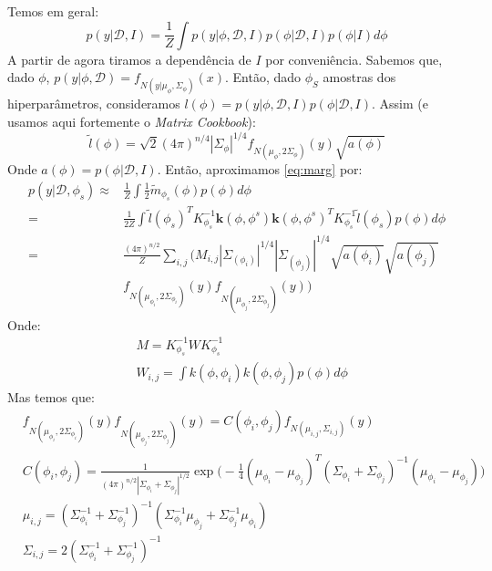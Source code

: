 \documentclass[12pt]{article}
\begin{document}
 Temos em geral:
 \begin{equation}\label{eq:marg}
	p(y|\mathcal{D},I) = \frac{1}{Z} \int p(y | \phi, \mathcal{D},I) p(\phi| \mathcal{D},I) 
		p(\phi | I) d \phi
 \end{equation}
 A partir de agora tiramos a dependência de $I$ por conveniência. Sabemos que, dado $\phi$, 
 $p(y | \phi, \mathcal{D}) = f_{N(y | \mu_\phi, \Sigma_\phi)}(x)$. Então, dado $\phi_S$ 
 amostras dos hiperparâmetros, consideramos $l(\phi) = p(y | \phi, \mathcal{D},I) p(\phi| \mathcal{D},I)$. 
 Assim (e usamos aqui fortemente o \textit{Matrix Cookbook}):
 \begin{equation}
	\tilde{l}(\phi) = \sqrt{2} (4 \pi)^{n/4} |\Sigma_{\phi}|^{1/4} f_{N(\mu_\phi, 2 \Sigma_\phi)}(y) 
		\sqrt{a(\phi)}
 \end{equation}
 Onde $a(\phi) = p(\phi| \mathcal{D},I)$. Então, aproximamos \eqref{eq:marg} por:
 \begin{equation}\label{eq:approx1}
 \begin{split}
 p(y | \mathcal{D},\phi_s) \approx & \frac{1}{Z} \int \frac{1}{2} \tilde{m}_{\phi_s}(\phi) p(\phi) 
             d\phi \\
	 = & \frac{1}{2 Z} \int \tilde{l}(\phi_s)^T K_{\phi_s}^{-1} \mathbf{k}(\phi,\phi^s) 
						    \mathbf{k}(\phi,\phi^s)^T K_{\phi_s}^{-1} \tilde{l}(\phi_s) 
						    p(\phi) d\phi \\
	 = & \frac{(4 \pi)^{n/2}}{Z} \sum_{i,j} \Big( M_{i,j} |\Sigma_{(\phi_i)}|^{1/4} |\Sigma_{(\phi_j)}|^{1/4} 
			   \sqrt{a(\phi_i)} \sqrt{a(\phi_j)} \\
	 & f_{N(\mu_{\phi_i}, 2 \Sigma_{\phi_i})}(y) f_{N(\mu_{\phi_j}, 2 \Sigma_{\phi_j})}(y) \Big)
 \end{split}
 \end{equation}
 Onde:
 \begin{equation}
  \begin{split}
  & M = K_{\phi_s}^{-1} W K_{\phi_s}^{-1} \\
  & W_{i,j} = \int k(\phi,\phi_i) k(\phi,\phi_j) p(\phi) d \phi
  \end{split}
 \end{equation}
 Mas temos que:
 \begin{equation}
  \begin{split}
   & f_{N(\mu_{\phi_i}, 2 \Sigma_{\phi_i})}(y) f_{N(\mu_{\phi_j}, 2 \Sigma_{\phi_j})}(y) = 
    C(\phi_i,\phi_j) f_{N(\mu_{i,j}, \Sigma_{i,j})}(y) \\
    & C(\phi_i,\phi_j) = \frac{1}{(4 \pi)^{n/2} |\Sigma_{\phi_i} + \Sigma_{\phi_j}|^{1/2}} 
					         \exp \Big(-\frac{1}{4} (\mu_{\phi_i} - \mu_{\phi_j})^T (\Sigma_{\phi_i} + \Sigma_{\phi_j})^{-1} (\mu_{\phi_i} - \mu_{\phi_j})\Big) \\
	& \mu_{i,j} = (\Sigma_{\phi_i}^{-1} + \Sigma_{\phi_j}^{-1})^{-1} (\Sigma_{\phi_i}^{-1} \mu_{\phi_j} +
																		\Sigma_{\phi_j}^{-1} \mu_{\phi_i}) \\
	& \Sigma_{i,j} = 2 (\Sigma_{\phi_i}^{-1} + \Sigma_{\phi_j}^{-1})^{-1}
  \end{split}
 \end{equation}
\end{document}
